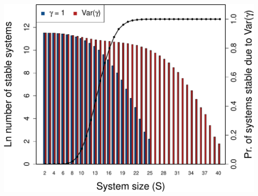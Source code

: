 \documentclass[]{article}
\begin{document}
\includegraphics{ms_files/figure-latex/unnamed-chunk-16-1.pdf}
\end{document}
